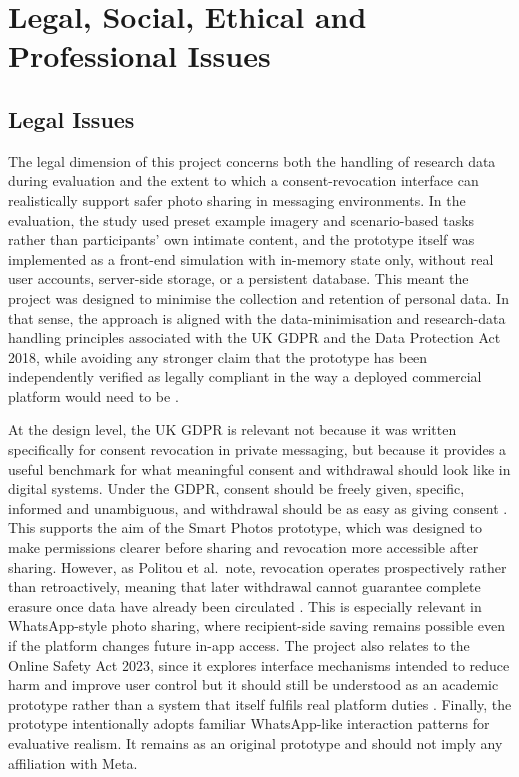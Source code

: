 \chapter{Legal, Social, Ethical and Professional Issues}

\section{Legal Issues}

The legal dimension of this project concerns both the handling of research data during evaluation and the extent to which a consent-revocation interface can realistically support safer photo sharing in messaging environments. In the evaluation, the study used preset example imagery and scenario-based tasks rather than participants' own intimate content, and the prototype itself was implemented as a front-end simulation with in-memory state only, without real user accounts, server-side storage, or a persistent database. This meant the project was designed to minimise the collection and retention of personal data. In that sense, the approach is aligned with the data-minimisation and research-data handling principles associated with the UK GDPR and the Data Protection Act 2018, while avoiding any stronger claim that the prototype has been independently verified as legally compliant in the way a deployed commercial platform would need to be \cite{gdpr_2016, dpa_2018}.

At the design level, the UK GDPR is relevant not because it was written specifically for consent revocation in private messaging, but because it provides a useful benchmark for what meaningful consent and withdrawal should look like in digital systems. Under the GDPR, consent should be freely given, specific, informed and unambiguous, and withdrawal should be as easy as giving consent \cite{gdpr_2016}. This supports the aim of the Smart Photos prototype, which was designed to make permissions clearer before sharing and revocation more accessible after sharing. However, as Politou et al.\ note, revocation operates prospectively rather than retroactively, meaning that later withdrawal cannot guarantee complete erasure once data have already been circulated \cite{politou_2018}. This is especially relevant in WhatsApp-style photo sharing, where recipient-side saving remains possible even if the platform changes future in-app access. The project also relates to the Online Safety Act 2023, since it explores interface mechanisms intended to reduce harm and improve user control but it should still be understood as an academic prototype rather than a system that itself fulfils real platform duties \cite{online_safety_act_2023}. Finally, the prototype intentionally adopts familiar WhatsApp-like interaction patterns for evaluative realism. It remains as an original prototype and should not imply any affiliation with Meta.


